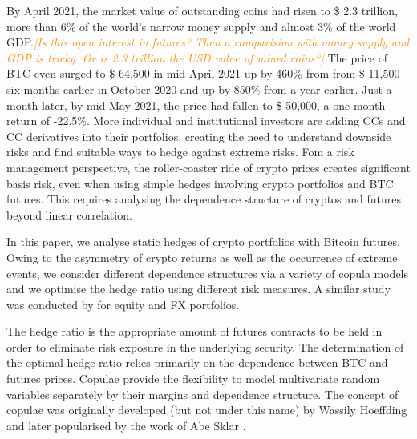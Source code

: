 \documentclass[11pt,a4paper,english]{article}
\providecommand{\natp}[1]{\textcolor{darkorange}{#1}}
\begin{document}
By April 2021, the market value of outstanding coins had risen to
\$ 2.3 trillion, more than 6\% of the world's narrow money supply and
almost 3\% of the world GDP.\natp{\em [Is this open interest in
  futures? Then a comparision with money supply and GDP is
  tricky. Or is 2.3 trillion the USD value of mined coins?]} The price
of BTC even surged to \$ 64,500 in mid-April 2021 up by 460\% from 
 from \$ 11,500 six months earlier in October 2020 and up by 850\%
 from a year earlier. Just a month later, by mid-May 2021, the price
 had fallen to \$ 50,000, a one-month return of -22.5\%. 
More individual and institutional investors are adding CCs and CC
derivatives into their portfolios, creating the need to understand
downside risks and find suitable ways to hedge against extreme risks. 
Fom a risk management perspective, the roller-coaster ride
of crypto prices creates significant basis risk, even when using
simple hedges involving crypto portfolios and BTC futures. This
requires analysing the dependence structure of cryptos and
futures beyond linear correlation.

In this paper, we analyse static hedges of crypto portfolios
with Bitcoin futures. Owing to the asymmetry of crypto returns as
well as the occurrence of extreme events, we consider different 
dependence structures via a variety of copula models and we optimise
the hedge ratio using different risk measures. A similar study was
conducted by \citep{barbi2014copula} for equity and FX portfolios. 
%
%



The hedge ratio is the appropriate amount of futures contracts to be
held in order to eliminate risk exposure in the underlying security.  
The determination of the optimal hedge ratio relies primarily
on the dependence between BTC and futures prices.
Copulae provide the flexibility to model multivariate random variables
separately by their margins and dependence structure.
The concept of copulae was originally developed (but not under this
name) by Wassily Hoeffding \citep{hoeffding1940masstabinvariante}
and later popularised by the work of Abe Sklar \citep{Sklar1959}.
\end{document}
